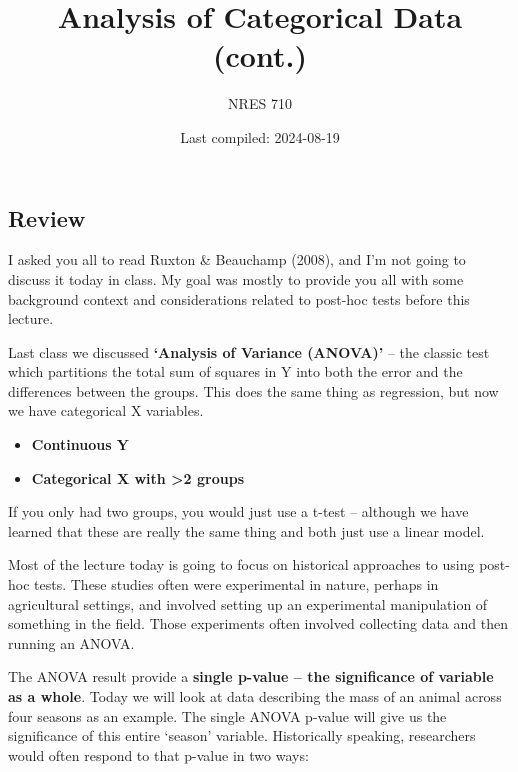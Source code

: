 \documentclass[
]{article}
\title{Analysis of Categorical Data (cont.)}
\author{NRES 710}
\date{Last compiled: 2024-08-19}
\providecommand{\tightlist}{%
  \setlength{\itemsep}{0pt}\setlength{\parskip}{0pt}}
\begin{document}
\maketitle

\subsection{Review}\label{review}

I asked you all to read Ruxton \& Beauchamp (2008), and I'm not going to
discuss it today in class. My goal was mostly to provide you all with
some background context and considerations related to post-hoc tests
before this lecture.

Last class we discussed \textbf{`Analysis of Variance (ANOVA)'} -- the
classic test which partitions the total sum of squares in Y into both
the error and the differences between the groups. This does the same
thing as regression, but now we have categorical X variables.

\begin{itemize}
\tightlist
\item
  \textbf{Continuous Y}
\item
  \textbf{Categorical X with \textgreater2 groups}
\end{itemize}

If you only had two groups, you would just use a t-test -- although we
have learned that these are really the same thing and both just use a
linear model.

Most of the lecture today is going to focus on historical approaches to
using post-hoc tests. These studies often were experimental in nature,
perhaps in agricultural settings, and involved setting up an
experimental manipulation of something in the field. Those experiments
often involved collecting data and then running an ANOVA.

The ANOVA result provide a \textbf{single p-value -- the significance of
variable as a whole}. Today we will look at data describing the mass of
an animal across four seasons as an example. The single ANOVA p-value
will give us the significance of this entire `season' variable.
Historically speaking, researchers would often respond to that p-value
in two ways:
\end{document}
